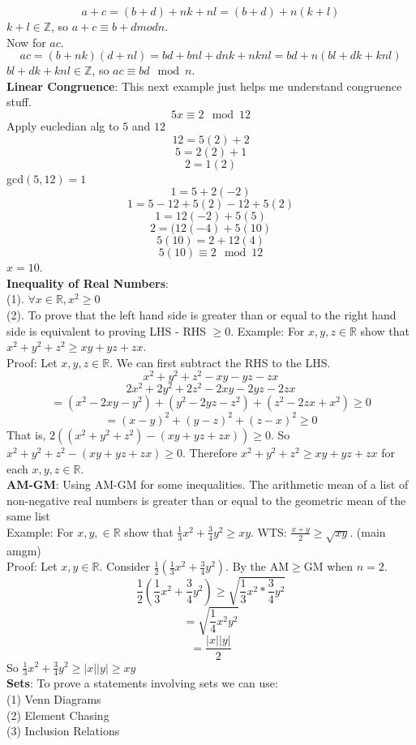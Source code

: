 \documentclass{article}
\begin{document}
\[a + c = (b+d)+nk+nl = (b+d)+n(k+l)\]
\(k+l \in \mathbb{Z}\), so \(a+c \equiv b+d mod n\).\\
Now for \(ac\).
\[ac = (b+nk)(d+nl)=bd+bnl+dnk+nknl=bd+n(bl+dk+knl)\]
\(bl+dk+knl \in \mathbb{Z}\), so \(ac \equiv bd \mod n\).\\
\textbf{Linear Congruence}: This next example just helps me understand congruence stuff.
\[5x \equiv 2 \mod 12\]
Apply eucledian alg to \(5\) and \(12\)
\[12 = 5(2) + 2\]
\[5 = 2(2) + 1\]
\[2 = 1(2)\]
gcd\((5,12) = 1\)
\[1 = 5+2(-2)\]
\[1 = 5 - 12 + 5(2) - 12 + 5(2)\]
\[1 = 12(-2)+5(5)\]
\[2 = (12(-4)+5(10)\]
\[5(10) = 2 + 12(4)\]
\[5(10) \equiv 2 \mod 12\]
\(x = 10\).\\
\textbf{Inequality of Real Numbers}:\\
(1). \(\forall x \in \mathbb{R}, x^2 \geq 0\)\\
(2). To prove that the left hand side is greater than or equal to the right hand side is equivalent to proving LHS - RHS \(\geq 0\).
Example: For \(x,y,z \in \mathbb{R}\) show that \(x^2+y^2+z^2 \geq xy+yz+zx\).\\
Proof: Let \(x,y,z \in \mathbb{R}\). We can first subtract the RHS to the LHS.
\[x^2+y^2+z^2-xy-yz-zx\]
\[2x^2+2y^2+2z^2-2xy-2yz-2zx\]
\[=(x^2-2xy-y^2)+(y^2-2yz-z^2)+(z^2-2zx+x^2)\geq 0\]
\[=(x-y)^2+(y-z)^2+(z-x)^2 \geq 0\]
That is, \(2((x^2+y^2+z^2)-(xy+yz+zx)) \geq 0\). So \(x^2+y^2+z^2-(xy+yz+zx) \geq 0\). Therefore \(x^2+y^2+z^2 \geq xy+yz+zx\) for each \(x,y,z \in \mathbb{R}\).\\
\textbf{AM-GM}: Using AM-GM for some inequalities. The arithmetic mean of a list of non-negative real numbers is greater than or equal to the geometric mean of the same list\\
Example: For \(x,y, \in \mathbb{R}\) show that \(\frac{1}{3}x^2+\frac{3}{4}y^2 \geq xy\). WTS: \(\frac{x+y}{2} \geq \sqrt{xy}\). (main amgm)\\
Proof: Let \(x,y \in \mathbb{R}\). Consider \(\frac{1}{2}(\frac{1}{3}x^2+\frac{3}{4}y^2)\). By the AM\(\geq\)GM when \(n = 2\).
\[\frac{1}{2}(\frac{1}{3}x^2+\frac{3}{4}y^2) \geq \sqrt{\frac{1}{3}x^2*\frac{3}{4}y^2}\]
\[=\sqrt{\frac{1}{4}x^2y^2}\]
\[=\frac{|x||y|}{2}\]
So  \(\frac{1}{3}x^2+\frac{3}{4}y^2 \geq |x||y| \geq xy\) \\
\textbf{Sets}: To prove a statements involving sets we can use:\\
(1) Venn Diagrams\\
(2) Element Chasing\\
(3) Inclusion Relations\\
\end{document}
